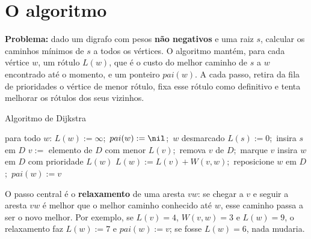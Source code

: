 \section{O algoritmo}\label{sec:dijalg}
\textbf{Problema:} dado um digrafo com pesos \textbf{não negativos} e uma raiz $s$, calcular os caminhos mínimos de $s$ a todos os vértices. O algoritmo mantém, para cada vértice $w$, um rótulo $L(w)$, que é o custo do melhor caminho de $s$ a $w$ encontrado até o momento, e um ponteiro $pai(w)$. A cada passo, retira da fila de prioridades o vértice de menor rótulo, fixa esse rótulo como definitivo e tenta melhorar os rótulos dos seus vizinhos.
\begin{pseudo}{Algoritmo de Dijkstra}
\begin{algorithmic}
  \State para todo $w$: $L(w):=\infty$;\ $pai(w):=\nil$;\ $w$ desmarcado
  \State $L(s):=0$;\ insira $s$ em $D$
    \State $v:=$ elemento de $D$ com menor $L(v)$;\ remova $v$ de $D$;\ marque $v$ 
       \State insira $w$ em $D$ com prioridade $L(w)$ \EndIf
       
        \State $L(w):=L(v)+W(v,w)$;\ reposicione $w$ em $D$;\ $pai(w):=v$
      \EndIf
    \EndFor
  \EndWhile
\EndProcedure
\end{algorithmic}
\end{pseudo}
O passo central é o \textbf{relaxamento} de uma aresta $vw$: se chegar a $v$ e seguir a aresta $vw$ é melhor que o melhor caminho conhecido até $w$, esse caminho passa a ser o novo melhor. Por exemplo, se $L(v)=4$, $W(v,w)=3$ e $L(w)=9$, o relaxamento faz $L(w):=7$ e $pai(w):=v$; se fosse $L(w)=6$, nada mudaria.

